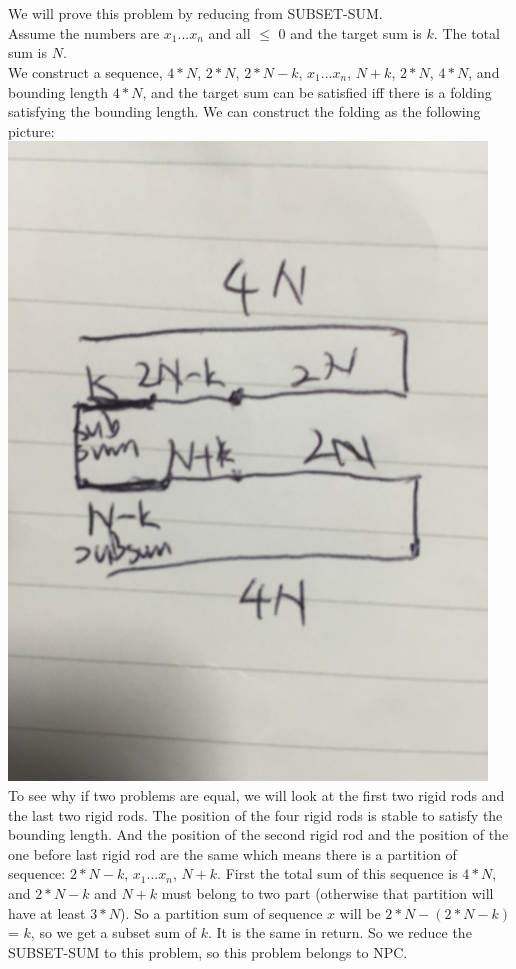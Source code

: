 \documentclass[11pt]{article}
\begin{document}
\part{}
    We will prove this problem by reducing from SUBSET-SUM. \\
    Assume the numbers are $x_{1}$...$x_{n}$ and all $\leq$ 0 and the target sum is $k$. The total sum is $N$. \\
    We construct a sequence, $4*N$, $2*N$, $2*N-k$, $x_{1}$...$x_{n}$, $N+k$, $2*N$, $4*N$, and bounding length $4*N$, and the target sum can be satisfied iff there is a folding satisfying the bounding length. We can construct the folding as the following picture: \\
    \includegraphics[width=5in]{part4}\\
    To see why if two problems are equal, we will look at the first two rigid rods and the last two rigid rods. The position of the four rigid rods is stable to satisfy the bounding length. And the position of the second rigid rod and the position of the one before last rigid rod are the same which means there is a partition of sequence: $2*N-k$, $x_{1}$...$x_{n}$, $N+k$. First the total sum of this sequence is $4*N$, and $2*N-k$ and $N+k$ must belong to two part (otherwise that partition will have at least $3*N$). So a partition sum of sequence $x$ will be $2*N - (2*N-k)$ = $k$, so we get a subset sum of $k$. It is the same in return. So we reduce the SUBSET-SUM to this problem, so this problem belongs to NPC.
\end{document}
